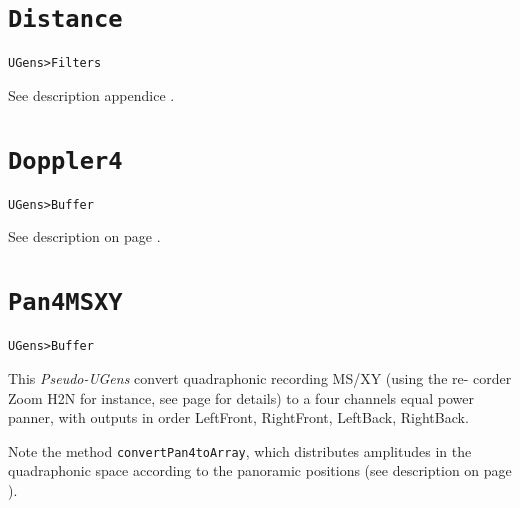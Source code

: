 \section{\texttt{Distance}}
\label{ugdist}

\texttt{UGens>Filters}

\bigskip

See description appendice .

\section{\texttt{Doppler4}}
\label{ugdop}

\texttt{UGens>Buffer}

\bigskip

See description on page \pageref{dop}.


\section{\texttt{Pan4MSXY}}
\label{msxy}

\texttt{UGens>Buffer}

\bigskip

This  \textit{Pseudo-UGens} convert quadraphonic recording MS/XY (using the re- corder Zoom H2N for instance, see page \pageref{mp:msxy} for details) to a four channels equal power panner, with outputs in order LeftFront, RightFront, LeftBack, RightBack.

Note the method \texttt{convertPan4toArray}, which distributes amplitudes in the quadraphonic space according to the panoramic positions (see description on page \pageref{pandist}).

\bigskip

